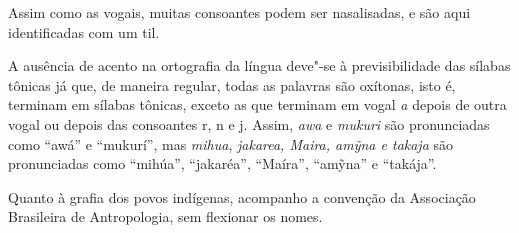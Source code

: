 
Assim como as vogais, muitas consoantes podem ser nasalisadas, e são
aqui identificadas com um til.

A ausência de acento na ortografia da língua deve"-se à previsibilidade
das sílabas tônicas já que, de maneira regular, todas as palavras são
oxítonas, isto é, terminam em sílabas tônicas, exceto as que terminam em
vogal \emph{a} depois de outra vogal ou depois das consoantes r, n e j.
Assim, \emph{awa} e \emph{mukuri} são pronunciadas como ``awá'' e
``mukurí'', mas \emph{mihua}, \emph{jakarea, Maira, amỹna e takaja} são
pronunciadas como ``mihúa'', ``jakaréa'', ``Maíra'', ``amỹna'' e
``takája''.

Quanto à grafia dos povos indígenas, acompanho a convenção da Associação
Brasileira de Antropologia, sem flexionar os nomes.
